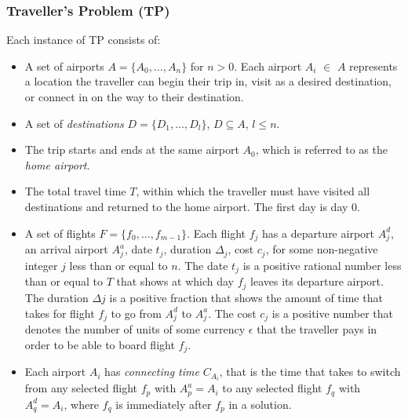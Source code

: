 \documentclass{mpaper}
\begin{document}
\subsubsection{Traveller's Problem (TP)}
\begin{instance}
Each instance of TP consists of:

\begin{itemize}[topsep=0.1em]
\setlength\itemsep{0.1em}
\item A set of airports $A = \{ A_{0},...,A_{n} \}$ for $n > 0$. Each airport $A_{i}$ $\in$ $A$ represents a location the traveller can begin their trip in, visit as a desired destination, or connect in on the way to their destination.

\item A set of \textit{destinations} $D = \{ D_{1},...,D_{l} \}$, $D \subseteq A$, $l \leq n$.

\item The trip starts and ends at the same airport $A_{0}$, which is referred to as the \textit{home airport}.

\item The total travel time $T$, within which the traveller must have visited all destinations and returned to the home airport. The first day is day 0.
 
\item A set of flights $F = \{ f_{0},...,f_{m-1} \}$. Each flight $f_{j}$ has a departure airport $A^{d}_{j}$, an arrival airport $A^{a}_{j}$, date $t_{j}$, duration $\Delta_{j}$, cost $c_{j}$,
for some non-negative integer $j$ less than or equal to $n$.
The date $t_{j}$ is a positive rational number less than or equal to $T$ that shows at which day $f_{j}$ leaves its departure airport. The duration $\Delta{j}$ is a positive fraction that shows the amount of time that takes for flight $f_{j}$ to go from $A^{d}_{j}$ to $A^{a}_{j}$. The cost $c_{j}$ is a positive number that denotes the number of units of some currency $\epsilon$ that the traveller pays in order to be able to board flight $f_{j}$.

\item Each airport $A_{i}$ has \textit{connecting time} $C_{A_{i}}$, that is the time that takes to switch from any selected flight $f_{p}$ with $A^{a}_{p} = A_{i}$ to any selected flight $f_{q}$ with $A^{d}_{q} = A_{i}$, where $f_{q}$ is immediately after $f_{p}$ in a solution.
\end{itemize}
\end{instance}
\end{document}
